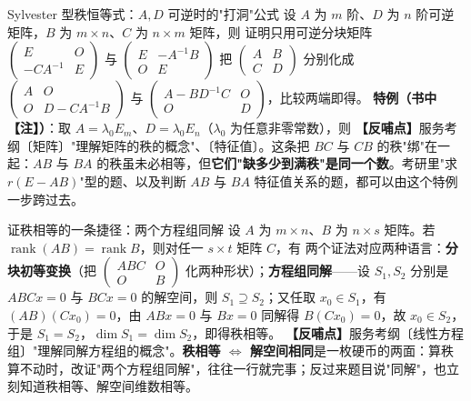 \begin{fdeep}{Sylvester 型秩恒等式：$A,D$ 可逆时的"打洞"公式}
设 $A$ 为 $m$ 阶、$D$ 为 $n$ 阶可逆矩阵，$B$ 为 $m\times n$、$C$ 为 $n\times m$ 矩阵，则
证明只用可逆分块矩阵
$\begin{pmatrix}E&O\\ -CA^{-1}&E\end{pmatrix}$ 与 $\begin{pmatrix}E&-A^{-1}B\\ O&E\end{pmatrix}$ 把 $\begin{pmatrix}A&B\\ C&D\end{pmatrix}$ 分别化成 $\begin{pmatrix}A&O\\ O&D-CA^{-1}B\end{pmatrix}$ 与 $\begin{pmatrix}A-BD^{-1}C&O\\ O&D\end{pmatrix}$，比较两端即得。
\textbf{特例（书中【注】）}：取 $A=\lambda_0E_m$、$D=\lambda_0E_n$（$\lambda_0$ 为任意非零常数），则
\textbf{【反哺点】}服务考纲〔矩阵〕"理解矩阵的秩的概念"、〔特征值〕。这条把 $BC$ 与 $CB$ 的秩"绑"在一起：$AB$ 与 $BA$ 的秩虽未必相等，但\textbf{它们"缺多少到满秩"是同一个数}。考研里"求 $r(E-AB)$"型的题、以及判断 $AB$ 与 $BA$ 特征值关系的题，都可以由这个特例一步跨过去。
\end{fdeep}


\begin{fdeep}{证秩相等的一条捷径：两个方程组同解}
设 $A$ 为 $m\times n$、$B$ 为 $n\times s$ 矩阵。若 $\operatorname{rank}(AB)=\operatorname{rank}B$，则对任一 $s\times t$ 矩阵 $C$，有
两个证法对应两种语言：\textbf{分块初等变换}（把 $\begin{pmatrix}ABC&O\\ O&B\end{pmatrix}$ 化两种形状）；\textbf{方程组同解}——设 $S_1,S_2$ 分别是 $ABCx=0$ 与 $BCx=0$ 的解空间，则 $S_1\supseteq S_2$；又任取 $x_0\in S_1$，有 $(AB)(Cx_0)=0$，由 $ABx=0$ 与 $Bx=0$ 同解得 $B(Cx_0)=0$，故 $x_0\in S_2$，于是 $S_1=S_2$，$\dim S_1=\dim S_2$，即得秩相等。
\textbf{【反哺点】}服务考纲〔线性方程组〕"理解同解方程组的概念"。\textbf{秩相等 $\Longleftrightarrow$ 解空间相同}是一枚硬币的两面：算秩算不动时，改证"两个方程组同解"，往往一行就完事；反过来题目说"同解"，也立刻知道秩相等、解空间维数相等。
\end{fdeep}


